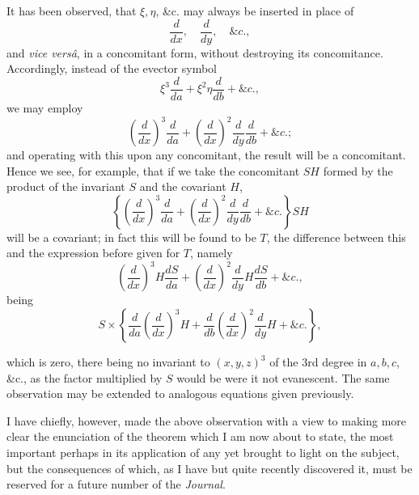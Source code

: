 \documentclass[11pt]{article}
\newcommand{\sourcepage}[1]{\marginpar{\scriptsize p.~#1}}
\begin{document}
{{It has been observed, that $\xi,\eta$, \&c. may always be inserted in place of
\[
\frac{d}{dx},\quad \frac{d}{dy},\quad \&c.,
\]
and \emph{vice versâ}, in a concomitant form, without destroying its concomitance. Accordingly, instead of the evector symbol
\[
\xi^3\frac{d}{da}+\xi^2\eta\frac{d}{db}+\&c.,
\]
we may employ
\[
\left(\frac{d}{dx}\right)^3\frac{d}{da}
+\left(\frac{d}{dx}\right)^2\frac{d}{dy}\frac{d}{db}+\&c.;
\]
and operating with this upon any concomitant, the result will be a concomitant. Hence we see, for example, that if we take the concomitant $SH$ formed by the product of the invariant $S$ and the covariant $H$,
\[
\left\{\left(\frac{d}{dx}\right)^3\frac{d}{da}
+\left(\frac{d}{dx}\right)^2\frac{d}{dy}\frac{d}{db}+\&c.\right\}SH
\]
will be a covariant; in fact this will be found to be $T$, the difference between this and the expression before given for $T$, namely
\[
\left(\frac{d}{dx}\right)^3H\frac{dS}{da}
+\left(\frac{d}{dx}\right)^2\frac{d}{dy}H\frac{dS}{db}+\&c.,
\]
being
\[
S\times\left\{\frac{d}{da}\left(\frac{d}{dx}\right)^3H
+\frac{d}{db}\left(\frac{d}{dx}\right)^2\frac{d}{dy}H+\&c.\right\},
\]

\sourcepage{340}
which is zero, there being no invariant to $(x,y,z)^3$ of the 3rd degree in $a,b,c$, \&c., as the factor multiplied by $S$ would be were it not evanescent. The same observation may be extended to analogous equations given previously.

I have chiefly, however, made the above observation with a view to making more clear the enunciation of the theorem which I am now about to state, the most important perhaps in its application of any yet brought to light on the subject, but the consequences of which, as I have but quite recently discovered it, must be reserved for a future number of the \emph{Journal}.

}}
\end{document}
